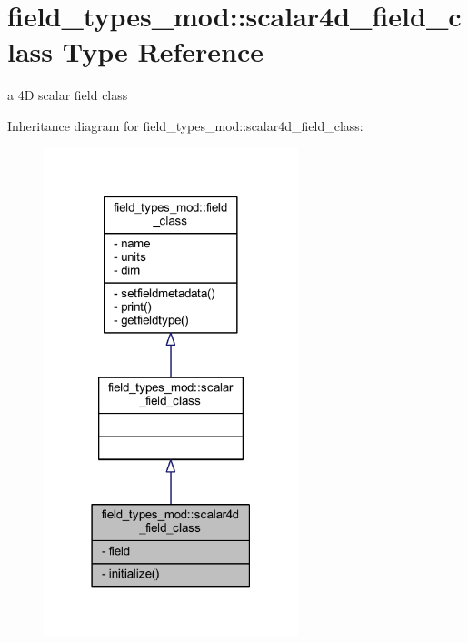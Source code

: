 \hypertarget{structfield__types__mod_1_1scalar4d__field__class}{}\section{field\+\_\+types\+\_\+mod\+:\+:scalar4d\+\_\+field\+\_\+class Type Reference}
\label{structfield__types__mod_1_1scalar4d__field__class}


a 4D scalar field class  




Inheritance diagram for field\+\_\+types\+\_\+mod\+:\+:scalar4d\+\_\+field\+\_\+class\+:
\nopagebreak
\begin{figure}[H]
\begin{center}
\leavevmode
\includegraphics[width=210pt]{structfield__types__mod_1_1scalar4d__field__class__inherit__graph}
\end{center}
\end{figure}



